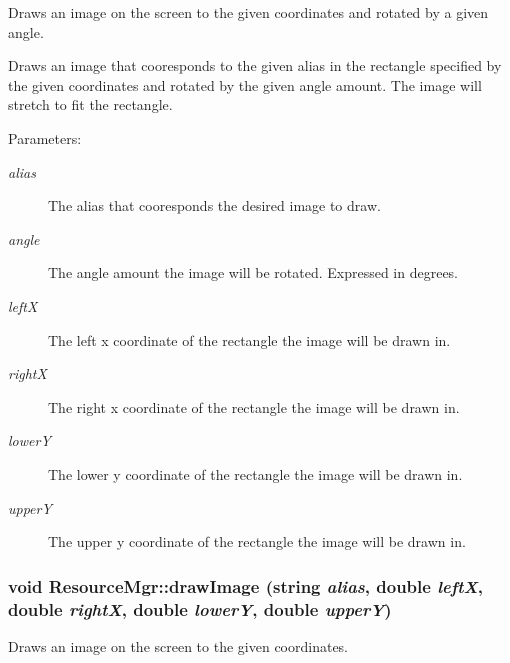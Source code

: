 Draws an image on the screen to the given coordinates and rotated by a given angle. 

Draws an image that cooresponds to the given alias in the rectangle specified by the given coordinates and rotated by the given angle amount. The image will stretch to fit the rectangle. \begin{Desc}
\item[Parameters:]
\begin{description}
\item[{\em alias}]The alias that cooresponds the desired image to draw. \item[{\em angle}]The angle amount the image will be rotated. Expressed in degrees. \item[{\em leftX}]The left x coordinate of the rectangle the image will be drawn in. \item[{\em rightX}]The right x coordinate of the rectangle the image will be drawn in. \item[{\em lowerY}]The lower y coordinate of the rectangle the image will be drawn in. \item[{\em upperY}]The upper y coordinate of the rectangle the image will be drawn in. \end{description}
\end{Desc}
\hypertarget{class_resource_mgr_95a5d22ee4e147ea77268a5e2aab8659}{
\subsubsection[{drawImage}]{\setlength{\rightskip}{0pt plus 5cm}void ResourceMgr::drawImage (string {\em alias}, \/  double {\em leftX}, \/  double {\em rightX}, \/  double {\em lowerY}, \/  double {\em upperY})}}
\label{class_resource_mgr_95a5d22ee4e147ea77268a5e2aab8659}


Draws an image on the screen to the given coordinates. 

